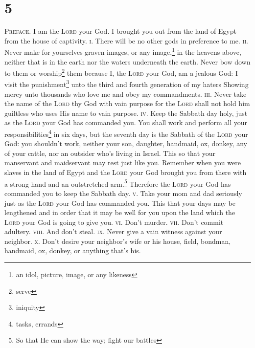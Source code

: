 \section{5}
\begin{enumerate}[align=center]
     \textsc{Preface.} I am the \textsc{Lord} your God. I brought you out from the land of Egypt~--- from the house of captivity.%
     \textsc{i.} There will be no other gods in preference to me.%
     \textsc{ii.} Never make for yourselves graven images, or any image,\footnote{an idol, picture, image, or any likeness} in the heavens above, neither that is in the earth nor the waters underneath the earth.%
     Never bow down to them or worship\footnote{serve} them because I, the \textsc{Lord} your God, am a jealous God: I visit the punishment\footnote{iniquity} unto the third and fourth generation of my haters%
     Showing mercy unto thousands who love me and obey my commandments.%
     \textsc{iii.} Never take the name of the \textsc{Lord} thy God with vain purpose for the \textsc{Lord} shall not hold him guiltless who uses His name to vain purpose.%
     \textsc{iv.} Keep the Sabbath day holy, just as the \textsc{Lord} your God has commanded you.%
     You shall work and perform all your responsibilities\footnote{tasks, errands} in six days,%
     but the seventh day is the Sabbath of the \textsc{Lord} your God: you shouldn't work, neither your son, daughter, handmaid, ox, donkey, any of your cattle, nor an outsider who's living in Israel. This so that your manservant and maidservant may rest just like you.%
     Remember when you were slaves in the land of Egypt and the \textsc{Lord} your God brought you from there with a strong hand and an outstretched arm.\footnote{So that He can show the way; fight our battles} Therefore the \textsc{Lord} your God has commanded you to keep the Sabbath day.%
     \textsc{v.} Take your mom and dad seriously just as the \textsc{Lord} your God has commanded you. This that your days may be lengthened and in order that it may be well for you upon the land which the \textsc{Lord} your God is going to give you.%
     \textsc{vi.} Don't murder.%
     \textsc{vii.} Don't commit adultery.%
     \textsc{viii.} And don't steal.%
     \textsc{ix.} Never give a vain witness against your neighbor.%
     \textsc{x.} Don't desire your neighbor's wife or his house, field, bondman, handmaid, ox, donkey, or anything that's his.%
\end{enumerate}
